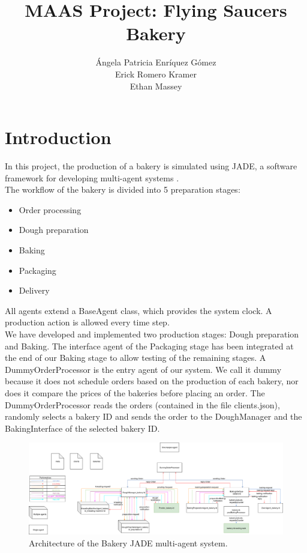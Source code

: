 \documentclass[paper=a4, fontsize=11pt]{scrartcl}
\title{MAAS Project: Flying Saucers Bakery}
\author{ \'{A}ngela Patricia Enr\'{i}quez G\'{o}mez \\
	Erick Romero Kramer \\
	Ethan Massey }
\begin{document}
	
	\maketitle
	
	\section{Introduction}
	
	In this project, the production of a bakery is simulated using JADE, a software framework for developing multi-agent systems \cite{Bellifemine}. \\
	
	The workflow of the bakery is divided into 5 preparation stages: 
	
	\begin{itemize}
		\item Order processing
		\item Dough preparation
		\item Baking
		\item Packaging
		\item Delivery
	\end{itemize}
	
	All agents extend a BaseAgent class, which provides the system clock. A production action is allowed every time step. \\
	
	We have developed and implemented two production stages: Dough preparation and Baking. The interface agent of the Packaging stage has been integrated at the end of our Baking stage to allow testing of the remaining stages. A DummyOrderProcessor is the entry agent of our system. We call it dummy because it does not schedule orders based on the production of each bakery, nor does it compare the prices of the bakeries before placing an order. The DummyOrderProcessor reads the orders (contained in the file clients.json), randomly selects a bakery ID and sends the order to the DoughManager and the BakingInterface of the selected bakery ID. \\
	
	
\begin{landscape}
	
	\begin{figure}
	\centering
	\includegraphics[width=1\linewidth]{images/architecture}
	\caption{Architecture of the Bakery JADE multi-agent system.}
	\label{fig:architecture}
	\end{figure}

\end{landscape}
\end{document}
